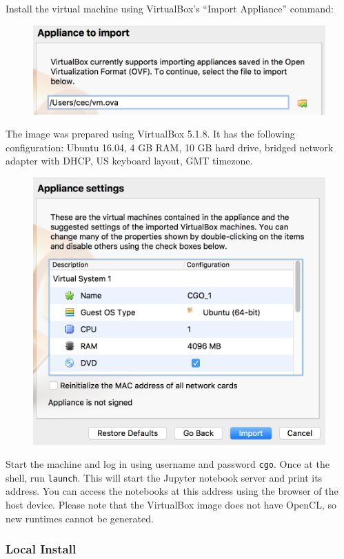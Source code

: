 \noindent
Install the virtual machine using VirtualBox's ``Import Appliance'' command:
\begin{figure}[H]
\includegraphics[width=\columnwidth]{img/vm1}
\end{figure}
\noindent
The image was prepared using VirtualBox 5.1.8. It has the following configuration: Ubuntu 16.04, 4 GB RAM, 10 GB hard drive, bridged network adapter with DHCP, US keyboard layout, GMT timezone.
\begin{figure}[H]
\includegraphics[width=\columnwidth]{img/vm2}
\end{figure}
\noindent
Start the machine and log in using username and password \texttt{cgo}. Once at the shell, run \texttt{launch}. This will start the Jupyter notebook server and print its address. You can access the notebooks at this address using the browser of the host device. Please note that the VirtualBox image does not have OpenCL, so new runtimes cannot be generated.

\subsubsection{Local Install}

